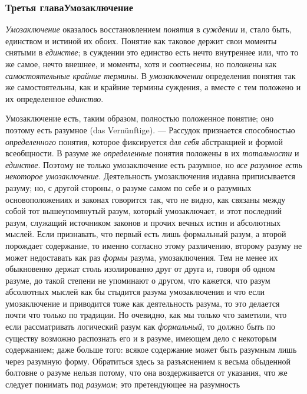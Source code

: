 \documentclass[twoside]{article}
\begin{document}
{{{\subsubsection[Третья глава Умозаключение]{Третья глава\newline Умозаключение}
{\em Умозаключение}
оказалось восстановлением
{\em понятия} в
{\em суждении} и, стало
быть, единством и истиной их обоих. Понятие как таковое держит свои моменты
снятыми в {\em единстве};
в суждении это единство есть нечто внутреннее или, что то же
самое, нечто внешнее, и моменты, хотя и соотнесены, но положены как
{\em самостоятельные крайние термины}.
В {\em умозаключении}
определения понятия так же самостоятельны, как и крайние
термины суждения, а вместе с тем положено и их определенное
{\em единство}.

Умозаключение есть, таким образом, полностью положенное
понятие; оно поэтому есть разумное (das Vernünftige). —
Рассудок признается способностью
{\em определенного}
понятия, которое фиксируется
{\em для себя} абстракцией и
формой всеобщности. В разуме же
{\em определенные}
понятия положены в их
{\em тотальности} и
{\em единстве}. Поэтому
не только умозаключение есть разумное, но
{\em все разумное есть некоторое
умозаключение}. Деятельность умозаключения издавна
приписывается разуму; но, с другой стороны, о разуме самом по себе и о
разумных основоположениях и законах говорится так, что не видно, как
связаны между собой тот вышеупомянутый разум, который умозаключает, и этот
последний разум, служащий источником законов и прочих вечных истин и
абсолютных мыслей. Если признавать, что первый есть лишь формальный разум,
а второй порождает содержание, то именно согласно этому различению, второму 
разуму не может недоставать как раз
{\em формы} разума,
умозаключения. Тем не менее их обыкновенно держат столь изолированно друг
от друга и, говоря об одном разуме, до такой степени не упоминают о
другом, что кажется, что разум абсолютных мыслей как бы
стыдится разума умозаключения и что если умозаключение и приводится тоже
как деятельность разума, то это делается почти что только по традиции. Но
очевидно, как мы только что заметили, что если рассматривать логический
разум как {\em формальный},
то должно быть по существу возможно распознать его и в
разуме, имеющем дело с некоторым содержанием; даже больше того: всякое
содержание может быть разумным лишь через разумную форму. Обратиться здесь
за разъяснением к весьма обыденной болтовне о разуме нельзя потому, что она
воздерживается от указания, что же следует понимать под
{\em разумом}; это
претендующее на разумность
}}}
\end{document}
